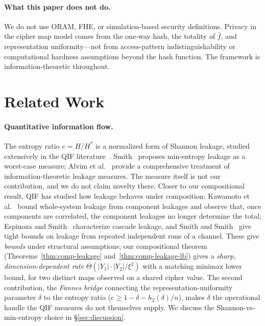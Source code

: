 \documentclass[11pt]{article}
\theoremstyle{definition}
\theoremstyle{plain}
\theoremstyle{remark}
\newcommand{\fhat}{\hat{f}}
\begin{document}
\paragraph{What this paper does not do.}
We do not use ORAM, FHE, or simulation-based security definitions.
Privacy in the cipher map model comes from the one-way hash, the totality
of $\fhat$, and representation uniformity---not from access-pattern
indistinguishability or computational hardness assumptions beyond the
hash function.  The framework is information-theoretic throughout.


\section{Related Work}
\label{sec:related}

\paragraph{Quantitative information flow.}
The entropy ratio $e = H/H^*$ is a normalized form of Shannon leakage,
studied extensively in the QIF
literature~\cite{smith2009foundations,alvim2020science}.
Smith~\cite{smith2009foundations} proposes min-entropy leakage as a
worst-case measure; Alvim et al.~\cite{alvim2020science} provide a
comprehensive treatment of information-theoretic leakage measures.
The measure itself is not our contribution, and we do not claim
novelty there.  Closer to our compositional result, QIF has studied
how leakage behaves under composition: Kawamoto et
al.~\cite{kawamoto2017compositionality} bound whole-system leakage from
component leakages and observe that, once components are correlated,
the component leakages no longer determine the total; Espinoza and
Smith~\cite{espinoza2012cascade} characterize cascade leakage, and
Smith and Smith~\cite{smith2017tight} give tight bounds on leakage from
repeated independent runs of a channel.  These give \emph{bounds} under
structural assumptions; our compositional theorem
(Theorems~\ref{thm:comp-leakage} and~\ref{thm:comp-leakage-lb}) gives a
\emph{sharp, dimension-dependent rate} $\Theta(|Y_1|\cdot|Y_2|/\xi^2)$
with a matching minimax lower bound, for two distinct maps observed on a
shared cipher value.  The second contribution, the \emph{Fannes bridge}
connecting the representation-uniformity parameter $\delta$ to the
entropy ratio ($e \geq 1 - \delta - h_2(\delta)/n$), makes $\delta$ the
operational handle the QIF measures do not themselves supply.  We
discuss the Shannon-vs-min-entropy choice in \S\ref{sec:discussion}.
\end{document}
